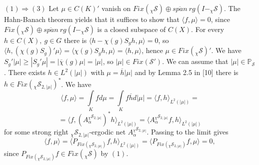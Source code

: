 \documentclass{amsart}
\theoremstyle{definition}
\theoremstyle{remark}
\numberwithin{equation}{section}
\newcommand{\bs}{\rightline{$\blacksquare$}}
\begin{document}
$(1) \Rightarrow (3)$ Let $\mu \in C(K)'$ vanish on $Fix(_{\chi}\mathcal{S}) \oplus \overline{span}\ rg (I - _{\chi}\mathcal{S})$. The Hahn-Banach theorem yields that it suffices to show that $\langle f, \mu \rangle = 0$, since $Fix(_{\chi}\mathcal{S}) \oplus \overline{span}\ rg (I - _{\chi}\mathcal{S})$ is a closed subspace of $C(X)$. For every $h \in C(X),\ g \in G$ there is $\langle h - \chi(g)S_g h, \mu \rangle = 0$, so $\langle h, (\chi(g)S_g)'\mu \rangle = \langle \chi(g)S_g h, \mu \rangle = \langle h, \mu \rangle$, hence $\mu \in Fix(_{\chi}\mathcal{S})'$. We have $S_g'|\mu| \geq |S_g'\mu| = |\overline{\chi}(g)\mu| = |\mu|$, so $|\mu| \in Fix(\mathcal{S}')$. We can assume that $|\mu| \in \mathbb{P}_{\mathcal{S}}$. There exists $h \in L^2(|\mu|)$ with $\mu = \overline{h}|\mu|$ and by Lemma 2.5 in [10] there is $h \in Fix(_{\chi}\mathcal{S}_{2,|\mu|})^*$. We have
\[ \langle f, \mu \rangle = \int \limits_K f d\mu = \int \limits_K f \overline{h}d|\mu| = \langle f, h \rangle_{L^2(|\mu|)} = \]
\[ = \langle f, (A_{\alpha}^{_{\chi}\mathcal{S}_{2,|\mu|}} )^* h \rangle_{L^2(|\mu|)} = \langle A_{\alpha}^{_{\chi}\mathcal{S}_{2,|\mu|}} f, h \rangle_{L^2(|\mu|)} \]
for some strong right $_{\chi}\mathcal{S}_{2, |\mu|}$-ergodic net $A_{\alpha}^{_{\chi}\mathcal{S}_{2,|\mu|}}$. Passing to the limit gives
\[ \langle f, \mu \rangle = \langle P_{Fix(_{\chi}\mathcal{S}_{2,|\mu|})}f , h \rangle_{L^2(|\mu|)} =  \langle P_{Fix(_{\chi}\mathcal{S}_{2,|\mu|})}f, \mu \rangle = 0,    \]
since $P_{Fix(_{\chi}\mathcal{S}_{2,|\mu|})}f \in Fix(_{\chi}\mathcal{S})$ by $(1)$.

\bs
\end{document}
